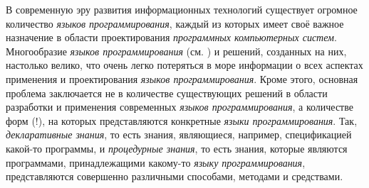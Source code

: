 В современную эру развития информационных технологий существует огромное количество \textit{языков программирования}, каждый из которых имеет своё важное назначение в области проектирования \textit{программных компьютерных систем}. Многообразие \textit{языков программирования} (см. ) и решений, созданных на них, настолько велико, что очень легко потеряться в море информации о всех аспектах применения и проектирования \textit{языков программирования}. Кроме этого, основная проблема заключается не в количестве существующих решений в области разработки и применения современных \textit{языков программирования}, а количестве форм (!), на которых представляются конкретные \textit{языки программирования}. Так, \textit{декларативные знания}, то есть знания, являющиеся, например, спецификацией какой-то программы, и \textit{процедурные знания}, то есть знания, которые являются программами, принадлежащими какому-то \textit{языку программирования}, представляются совершенно различными способами, методами и средствами.


